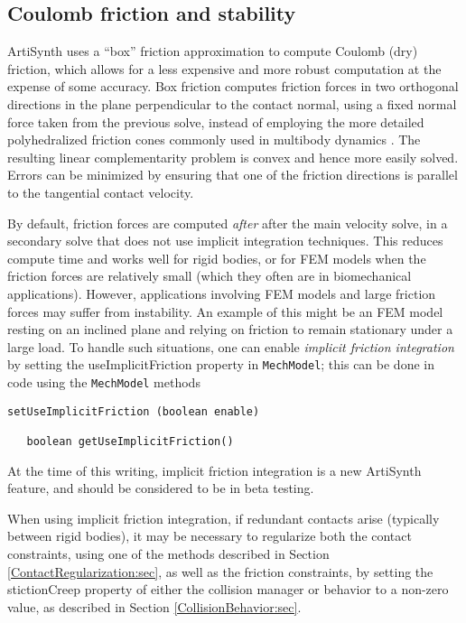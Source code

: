 \subsection{Coulomb friction and stability}
\label{FrictionAndStability:sec}

ArtiSynth uses a ``box'' friction approximation
\cite{Lacoursiere07} to compute Coulomb (dry) friction,
which allows for a less expensive and more robust computation at the
expense of some accuracy. Box friction computes friction forces in two
orthogonal directions in the plane perpendicular to the contact
normal, using a fixed normal force taken from the previous solve,
instead of employing the more detailed polyhedralized friction cones
commonly used in multibody dynamics
\cite{AnitescuPotra2002,PotraEtAlTrapezoidal2006}. 
The resulting linear complementarity problem is convex and hence more
easily solved. Errors can be minimized by ensuring that one of the
friction directions is parallel to the tangential contact velocity.

By default, friction forces are computed {\it after} after the main
velocity solve, in a secondary solve that does not use implicit
integration techniques. This reduces compute time and works well for
rigid bodies, or for FEM models when the friction forces are
relatively small (which they often are in biomechanical applications).
However, applications involving FEM models and large friction forces
may suffer from instability. An example of this might be an FEM model
resting on an inclined plane and relying on friction to remain
stationary under a large load. To handle such situations, one can
enable {\it implicit friction integration} by setting the {\sf
useImplicitFriction} property in {\tt MechModel}; this can be done in
code using the {\tt MechModel} methods
%
\begin{lstlisting}[]
   setUseImplicitFriction (boolean enable)

   boolean getUseImplicitFriction()
\end{lstlisting}
%

\begin{sideblock}
At the time of this writing, implicit friction integration is a new
ArtiSynth feature, and should be considered to be in beta testing.

When using implicit friction integration, if redundant contacts arise
(typically between rigid bodies), it may be necessary to regularize
both the contact constraints, using one of the methods described in
Section \ref{ContactRegularization:sec}, as well as the friction
constraints, by setting the {\sf stictionCreep} property of either the
collision manager or behavior to a non-zero value, as described in
Section \ref{CollisionBehavior:sec}.
\end{sideblock}

\ifdefined\maindoc
\else

\fi

